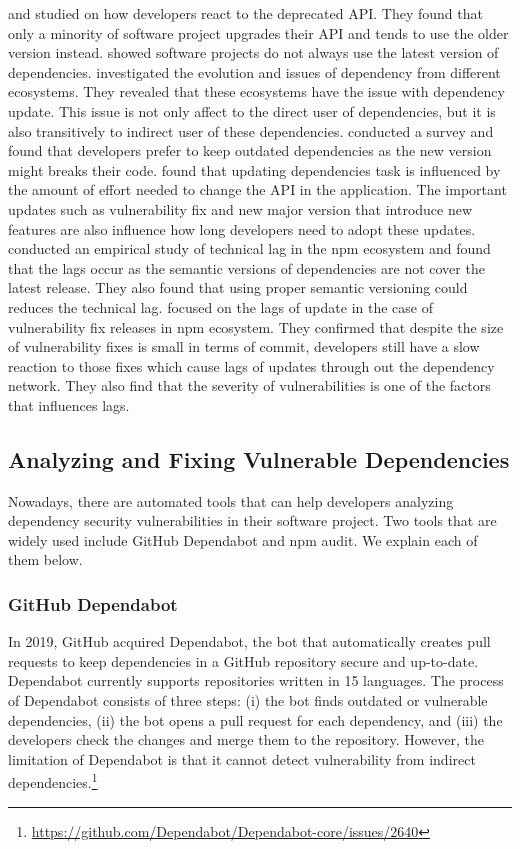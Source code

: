 \documentclass[conference]{IEEEtran}
\begin{document}
	\citet{Robbes:2012} and \citet{Sawant2016} studied on how developers react to the deprecated API.
	They found that only a minority of software project upgrades their API and tends to use the older version instead.
	\citet{Ihara:2017} showed software projects do not always use the latest version of dependencies.
	\citet{Decan:2017} investigated the evolution and issues of dependency from different ecosystems.
	They revealed that these ecosystems have the issue with dependency update.
	This issue is not only affect to the direct user of dependencies, but it is also transitively to indirect user of these dependencies.
	\citet{Bogart:2015} conducted a survey and found that developers prefer to keep outdated dependencies as the new version might breaks their code.
	\citet{Kula:2017} found that updating dependencies task is influenced by the amount of effort needed to change the API in the application.
	The important updates such as vulnerability fix and new major version that introduce new features are also influence how long developers need to adopt these updates.
	\citet{Decan:ICSME:2018} conducted an empirical study of technical lag in the npm ecosystem and found that the lags occur as the semantic versions of dependencies are not cover the latest release.
	They also found that using proper semantic versioning could reduces the technical lag.
	\citet{Chinthanet2021} focused on the lags of update in the case of vulnerability fix releases in npm ecosystem.
	They confirmed that despite the size of vulnerability fixes is small in terms of commit, developers still have a slow reaction to those fixes which cause lags of updates through out the dependency network.
	They also find that the severity of vulnerabilities is one of the factors that influences lags.
	
	\subsection{Analyzing and Fixing Vulnerable Dependencies}
	Nowadays, there are automated tools that can help developers analyzing dependency security vulnerabilities in their software project. Two tools that are widely used include GitHub Dependabot and npm audit. We explain each of them below.
	
	\subsubsection{GitHub Dependabot}
	In 2019, GitHub acquired Dependabot, the bot that automatically creates pull requests to keep dependencies in a GitHub repository secure and up-to-date.
	Dependabot currently supports repositories written in 15 languages.
	The process of Dependabot consists of three steps: (i) the bot finds outdated or vulnerable dependencies, (ii) the bot opens a pull request for each dependency, and (iii) the developers check the changes and merge them to the repository.
	However, the limitation of Dependabot is that it cannot detect vulnerability from indirect dependencies.\footnote{\url{https://github.com/Dependabot/Dependabot-core/issues/2640}}
\end{document}
